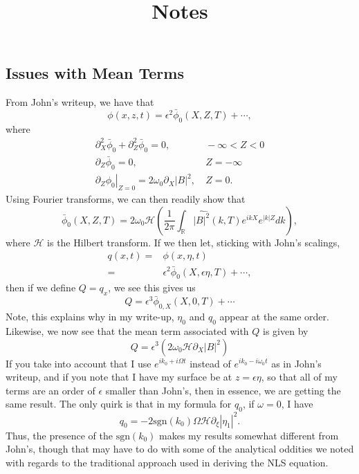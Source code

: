 \documentclass[a4paper,11pt]{article}
\title{Notes}
\date{}
\newcommand{\p}{\partial}
\begin{document}
\maketitle
\subsection*{Issues with Mean Terms}

From John's writeup, we have that 
\[
\phi(x,z,t) = \epsilon^{2}\bar{\phi}_{0}(X,Z,T) + \cdots,
\]
where 
\begin{align*}
\p_{X}^{2}\bar{\phi}_{0} + \p_{Z}^{2}\bar{\phi}_{0} = 0, & ~-\infty < Z < 0 \\
\p_{Z}\bar{\phi}_{0} = 0, & ~Z = -\infty\\
\left.\p_{Z}\phi_{0}\right|_{Z=0} = 2\omega_{0}\p_{X}\left|B\right|^{2}, & ~ Z=0.
\end{align*}
Using Fourier transforms, we can then readily show that 
\[
\bar{\phi}_{0}(X,Z,T) = 2\omega_{0}\mathcal{H}\left(\frac{1}{2\pi}\int_{\mathbb{R}} \widehat{\left| B\right|^{2}}(k,T) e^{ikX}e^{|k|Z} dk \right),
\]
where $\mathcal{H}$ is the Hilbert transform.  If we then let, sticking with John's scalings,
\begin{align*}
q(x,t) = & \phi(x,\eta,t) \\
= & \epsilon^{2}\bar{\phi}_{0}(X,\epsilon \eta,T) + \cdots,
\end{align*}
then if we define $Q = q_{x}$, we see this gives us 
\[
Q = \epsilon^{3}\bar{\phi}_{0,X}(X,0,T) + \cdots
\]
Note, this explains why in my write-up, $\eta_{0}$ and $q_{0}$ appear at the same order.  Likewise, we now see that the mean term associated with $Q$ is given by 
\[
Q = \epsilon^{3}\left( 2\omega_{0}\mathcal{H}\p_{X}\left|B\right|^{2}\right)
\]
If you take into account that I use $e^{ik_{0}+i\Omega t}$ instead of $e^{ik_{0}-i\omega_{0}t}$ as in John's writeup, and if you note that I have my surface be at $z=\epsilon \eta$, so that all of my terms are an order of $\epsilon$ smaller than John's, then in essence, we are getting the same result.  The only quirk is that in my formula for $q_{0}$, if $\omega =0$, I have 
\[
q_{0} = -2\mbox{sgn}(k_{0})\Omega \mathcal{H}\p_{\xi}\left|\eta_{1} \right|^{2}.
\]
Thus, the presence of the $\mbox{sgn}(k_{0})$ makes my results somewhat different from John's, though that may have to do with some of the analytical oddities we noted with regards to the traditional approach used in deriving the NLS equation.  
\end{document}
